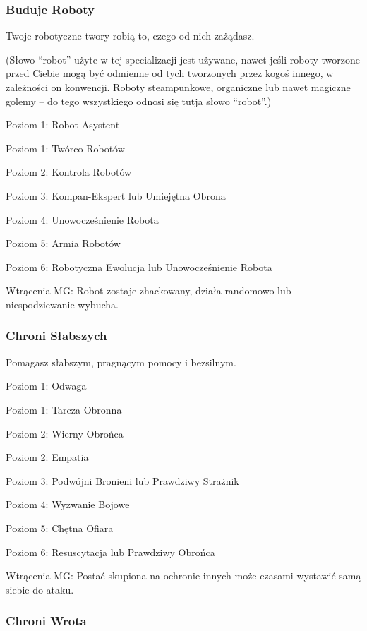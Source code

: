 \subsubsection{Buduje Roboty}

Twoje robotyczne twory robią to, czego od nich zażądasz. 

(Słowo “robot” użyte w tej specializacji jest używane, nawet jeśli roboty tworzone przed Ciebie mogą być odmienne od tych tworzonych przez kogoś innego, w zależności on konwencji. Roboty steampunkowe, organiczne lub nawet magiczne golemy – do 
tego wszystkiego odnosi się tutja słowo “robot”.)

Poziom 1: Robot-Asystent

Poziom 1: Twórco Robotów

Poziom 2: Kontrola Robotów

Poziom 3: Kompan-Ekspert lub Umiejętna Obrona

Poziom 4: Unowocześnienie Robota

Poziom 5: Armia Robotów

Poziom 6: Robotyczna Ewolucja lub Unowocześnienie Robota

Wtrącenia MG: Robot zostaje zhackowany, działa randomowo lub niespodziewanie wybucha.

\subsubsection{Chroni Słabszych}

Pomagasz słabszym, pragnącym pomocy i bezsilnym.

Poziom 1: Odwaga

Poziom 1: Tarcza Obronna

Poziom 2: Wierny Obrońca

Poziom 2: Empatia

Poziom 3: Podwójni Bronieni lub Prawdziwy Strażnik

Poziom 4: Wyzwanie Bojowe

Poziom 5: Chętna Ofiara

Poziom 6: Resuscytacja lub Prawdziwy Obrońca

Wtrącenia MG: Postać skupiona na ochronie innych może czasami wystawić samą siebie do ataku.

\subsubsection{Chroni Wrota}

